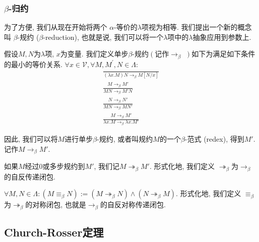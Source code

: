 \subsubsection{\texorpdfstring{$\beta$}{beta}-归约}
为了方便, 我们从现在开始将两个 $\alpha$-等价的$\lambda$项视为相等. 我们提出一个新的概念叫 $\beta$-规约 ($\beta$-reduction), 也就是说, 我们可以将一个$\lambda$项中的$\lambda$抽象应用到参数上. 
\begin{definition}
    假设$M, N$为$\lambda$项, $x$为变量. 我们定义单步$\beta$-规约$\left(\right.$记作$\to_\beta$ $\left.\right)$如下为满足如下条件的最小的等价关系. $\forall x\in \mathcal V, \forall M, M^\prime, N\in \Lambda$:%
    \begin{gather}
        \frac{ }{(\lambda x.M)N \to_\beta M[N/x]} \tag{$\beta$}\\
        \frac{M \to_\beta{M'}}{MN \to_\beta{M'}N}\tag{cong1}\\
        \frac{N \to_\beta{N'}}{MN \to_\beta{M}N'}\tag{cong2} \\
        \frac{M \to_\beta{M'}}{\lambda{x}.M \to_\beta\lambda{x}.M'}\tag{$\xi$}
    \end{gather}
\end{definition}
因此, 我们可以将$M$进行单步$\beta$-规约, 或者叫规约$M$的一个$\beta$-范式 (redex), 得到$M'$. 记作$M\to_\beta M'$.
\begin{definition}
    如果$M$经过0或多步规约到$M'$, 我们记$M\twoheadrightarrow_\beta M'$. 形式化地, 我们定义 $\twoheadrightarrow_\beta$为$\to_\beta$的自反传递闭包.
\end{definition}
\begin{definition}
    $\forall M, N \in \Lambda: (M\equiv_\beta N):=(M\twoheadrightarrow_\beta N)\land (N\twoheadrightarrow_\beta M)$. 形式化地, 我们定义 $\equiv_\beta$为$\twoheadrightarrow_\beta$的对称闭包, 也就是$\to_\beta$的自反对称传递闭包.
\end{definition}

\subsection{\textbf{Church-Rosser}定理}
